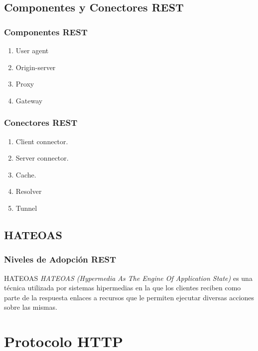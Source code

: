 \documentclass[a4paper,slidestop,xcolor=pst,blue]{beamer}
\begin{document}
\subsection{Componentes y Conectores REST}

\begin{frame}[c]
    \frametitle{Componentes REST}
    \begin{enumerate}[<+->]
        \item User agent
        \item Origin-server
        \item Proxy
        \item Gateway
    \end{enumerate}
\end{frame}

\begin{frame}[c]
    \frametitle{Conectores REST}
    \begin{enumerate}[<+->]
        \item Client connector.
        \item Server connector.
        \item Cache.
        \item Resolver
        \item Tunnel
    \end{enumerate}

\end{frame}

\subsection{HATEOAS}

\begin{frame}[c]
    \frametitle{Niveles de Adopción REST}
    \begin{block}{HATEOAS}
        \emph{HATEOAS (Hypermedia As The Engine Of Application State)} es una técnica utilizada por sistemas hipermedias en la que los clientes reciben como parte de la respuesta enlaces a recursos que le permiten ejecutar diversas acciones sobre las mismas.
    \end{block}
\end{frame}

\section{Protocolo HTTP}
\end{document}
